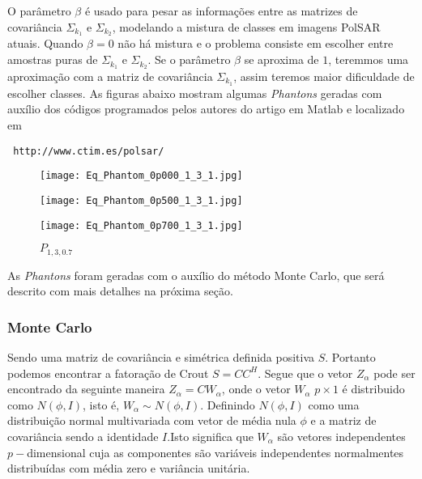 O parâmetro $\beta$ é usado para pesar as informações entre as matrizes de covariância $\Sigma_{k_1}$ e $\Sigma_{k_2}$, modelando a mistura de classes em imagens PolSAR atuais. Quando $\beta=0$ não há mistura e o problema consiste em escolher entre amostras puras de $\Sigma_{k_1}$ e $\Sigma_{k_2}$. Se o parâmetro $\beta$ se aproxima de $1$, teremmos uma aproximação com a matriz de covariância $\Sigma_{k_1}$, assim teremos maior dificuldade de escolher classes. As figuras abaixo mostram algumas {\it Phantons} geradas com auxílio dos códigos programados pelos autores do artigo em Matlab e localizado em  \begin{verbatim} http://www.ctim.es/polsar/\end{verbatim}

\begin{figure}[!htb]
  \texttt{[image: Eq\_Phantom\_0p000\_1\_3\_1.jpg]}
	\caption{$P_{1,3,0.0}$}\label{fig:awesome_image1}
\endminipage\hfill
{}
  \texttt{[image: Eq\_Phantom\_0p500\_1\_3\_1.jpg]}
	\caption{$P_{1,3,0.5}$}\label{fig:awesome_image1}
\endminipage\hfill
{}%
  \texttt{[image: Eq\_Phantom\_0p700\_1\_3\_1.jpg]}
	\caption{ $P_{1,3,0.7}$}\label{fig:awesome_image1}
\endminipage
\end{figure}

As {\it Phantons} foram geradas com o auxílio do método Monte Carlo, 
que será descrito com mais detalhes na próxima seção.

\subsubsection{Monte Carlo \cite{odell}}

Sendo uma matriz de covariância e simétrica definida positiva $S$. Portanto podemos encontrar a fatoração de Crout $S=CC^H$. Segue que o vetor $Z_{\alpha}$ pode ser encontrado da seguinte maneira $Z_{\alpha}=CW_{\alpha}$, onde o vetor $W_{\alpha}$ $p\times 1$ é distribuido como $N(\phi,I)$, isto é, $W_{\alpha}\sim N(\phi,I)$. Definindo $N(\phi,I)$ como uma distribuição normal multivariada com vetor de média nula $\phi$ e a matriz de covariância sendo a identidade $I$.Isto significa que $W_{\alpha}$ são vetores independentes $p-$dimensional cuja as componentes são variáveis independentes normalmentes distribuídas com média zero e variância unitária. 

